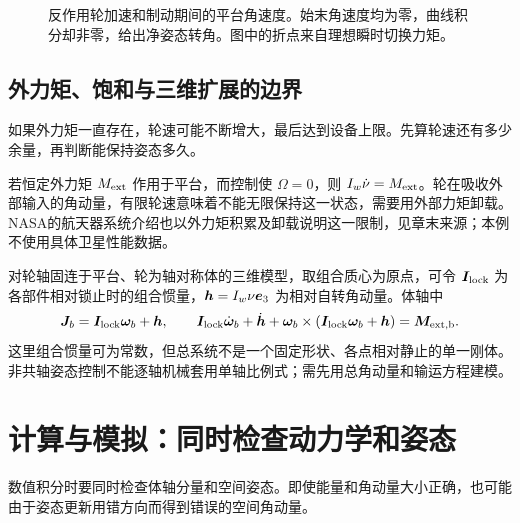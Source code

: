 \begin{figure}[htbp]
\centering
{}
\caption{反作用轮加速和制动期间的平台角速度。始末角速度均为零，曲线积分却非零，给出净姿态转角。图中的折点来自理想瞬时切换力矩。}
\label{fig:rigid-wheel}
\end{figure}

\subsection{外力矩、饱和与三维扩展的边界}
如果外力矩一直存在，轮速可能不断增大，最后达到设备上限。先算轮速还有多少余量，再判断能保持姿态多久。

若恒定外力矩 $M_{\rm ext}$ 作用于平台，而控制使 $\Omega=0$，则 $I_w\dot\nu=M_{\rm ext}$。轮在吸收外部输入的角动量，有限轮速意味着不能无限保持这一状态，需要用外部力矩卸载。NASA的航天器系统介绍也以外力矩积累及卸载说明这一限制，见章末来源；本例不使用具体卫星性能数据。

对轮轴固连于平台、轮为轴对称体的三维模型，取组合质心为原点，可令 $\boldsymbol{I}_{\rm lock}$ 为各部件相对锁止时的组合惯量，$\boldsymbol h=I_w\nu\boldsymbol{e}_3$ 为相对自转角动量。体轴中
\[
\boldsymbol{J}_b=\boldsymbol{I}_{\rm lock}\boldsymbol{\omega}_b+\boldsymbol h,\qquad
\boldsymbol{I}_{\rm lock}\dot{\boldsymbol{\omega}}_b+\dot{\boldsymbol h}
+\boldsymbol{\omega}_b\times(\boldsymbol{I}_{\rm lock}\boldsymbol{\omega}_b+\boldsymbol h)=\boldsymbol{M}_{\rm ext,b}.
\]
这里组合惯量可为常数，但总系统不是一个固定形状、各点相对静止的单一刚体。非共轴姿态控制不能逐轴机械套用单轴比例式；需先用总角动量和输运方程建模。


\section{计算与模拟：同时检查动力学和姿态}
数值积分时要同时检查体轴分量和空间姿态。即使能量和角动量大小正确，也可能由于姿态更新用错方向而得到错误的空间角动量。


